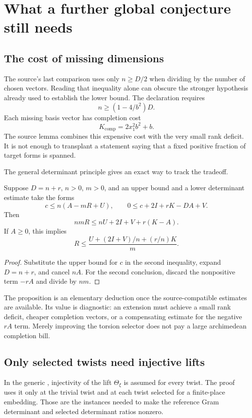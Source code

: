 \section{What a further global conjecture still needs}
\label{sec:global}

\subsection{The cost of missing dimensions}
The source's last comparison uses only $n\ge D/2$ when dividing by the number of chosen vectors. Reading that inequality alone can obscure the stronger hypothesis already used to establish the lower bound. The declaration
requires
\begin{equation}
n\ge(1-4/b^2)D.
\label{eq:near-full}
\end{equation}
Each missing basis vector has completion cost
\[
 K_{\mathrm{comp}}=2x_1^2b^2+b.
\]
The source lemma  combines this expensive cost with the very small rank deficit. It is not enough to transplant a statement saying that a fixed positive fraction of target forms is spanned.

The general determinant principle gives an exact way to track the tradeoff.
\begin{proposition}
\label{prop:rank}
Suppose $D=n+r$, $n>0$, $m>0$, and an upper bound and a lower determinant estimate take the forms
\[
 c\le n(A-mR+U),\qquad
 0\le c+2I+rK-DA+V.
\]
Then
\[
 nmR\le nU+2I+V+r(K-A).
\]
If $A\ge0$, this implies
\[
 R\le\frac{U+(2I+V)/n+(r/n)K}{m}.
\]
\end{proposition}
\begin{proof}
Substitute the upper bound for $c$ in the second inequality, expand $D=n+r$, and cancel $nA$. For the second conclusion, discard the nonpositive term $-rA$ and divide by $nm$.
\end{proof}
The proposition is an elementary deduction once the source-compatible estimates are available. Its value is diagnostic: an extension must achieve a small rank deficit, cheaper completion vectors, or a compensating estimate for the negative $rA$ term. Merely improving the torsion selector does not pay a large archimedean completion bill.

\subsection{Only selected twists need injective lifts}
In the generic
,
injectivity of the lift $\Theta_\xi$ is assumed for every twist. The proof uses it only at the trivial twist and at each twist selected for a finite-place embedding. Those are the instances needed to make the reference Gram determinant and selected determinant ratios nonzero.

